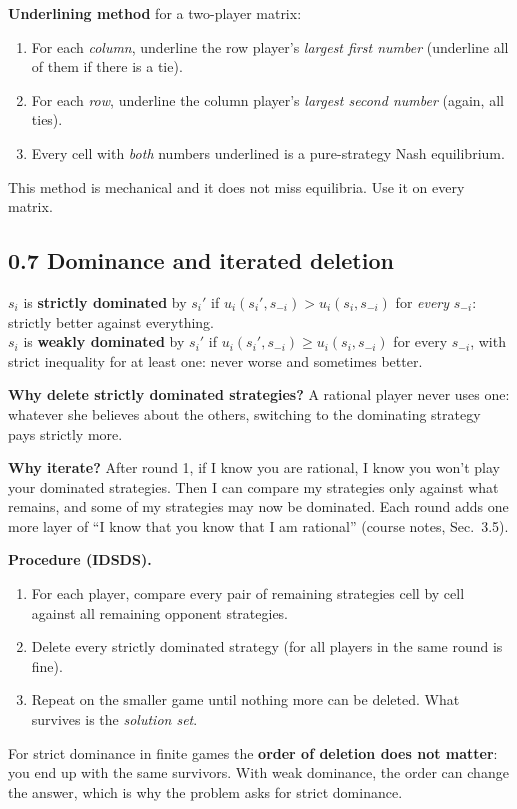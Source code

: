 \documentclass[11pt]{article}
\begin{document}
\textbf{Underlining method} for a two-player matrix:
\begin{enumerate}
\item For each \emph{column}, underline the row player's \emph{largest first number} (underline all of them if there is a tie).
\item For each \emph{row}, underline the column player's \emph{largest second number} (again, all ties).
\item Every cell with \emph{both} numbers underlined is a pure-strategy Nash equilibrium.
\end{enumerate}
This method is mechanical and it does not miss equilibria. Use it on every matrix.

\subsection*{0.7 Dominance and iterated deletion}
\begin{keyidea}
$s_i$ is \textbf{strictly dominated} by $s_i'$ if $u_i(s_i',s_{-i})>u_i(s_i,s_{-i})$ for \emph{every} $s_{-i}$: strictly better against everything.\\
$s_i$ is \textbf{weakly dominated} by $s_i'$ if $u_i(s_i',s_{-i})\ge u_i(s_i,s_{-i})$ for every $s_{-i}$, with strict inequality for at least one: never worse and sometimes better.
\end{keyidea}
\textbf{Why delete strictly dominated strategies?} A rational player never uses one: whatever she believes about the others, switching to the dominating strategy pays strictly more.

\textbf{Why iterate?} After round 1, if I know you are rational, I know you won't play your dominated strategies. Then I can compare my strategies only against what remains, and some of my strategies may now be dominated. Each round adds one more layer of ``I know that you know that I am rational'' (course notes, Sec.~3.5).

\textbf{Procedure (IDSDS).}
\begin{enumerate}
\item For each player, compare every pair of remaining strategies cell by cell against all remaining opponent strategies.
\item Delete every strictly dominated strategy (for all players in the same round is fine).
\item Repeat on the smaller game until nothing more can be deleted. What survives is the \emph{solution set}.
\end{enumerate}
For strict dominance in finite games the \textbf{order of deletion does not matter}: you end up with the same survivors. With weak dominance, the order can change the answer, which is why the problem asks for strict dominance.
\end{document}
